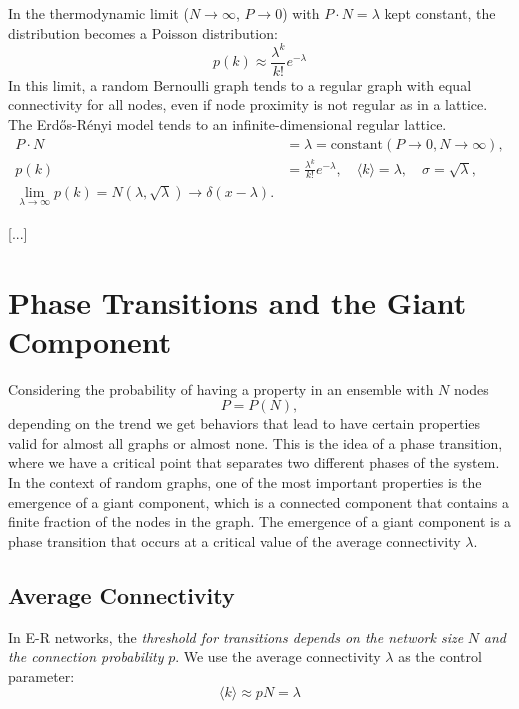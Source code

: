 \begin{remark}
    In the thermodynamic limit ($N \to \infty$, $P \to 0$) with $P \cdot N = \lambda$ kept constant, the distribution becomes a Poisson distribution:
    $$ p(k) \approx \frac{\lambda^k}{k!} e^{-\lambda} $$
    In this limit, a random Bernoulli graph tends to a regular graph with equal connectivity for all nodes, even if node proximity is not regular as in a lattice. The Erdős-Rényi model tends to an infinite-dimensional regular lattice.
    \[
        \begin{aligned}
            P \cdot N & = \lambda = \text{constant} (P \to 0, N \to \infty),                                                   \\
            p(k)      & = \frac{\lambda^k}{k!} e^{-\lambda}, \quad \langle k \rangle = \lambda, \quad \sigma = \sqrt{\lambda}, \\
            \lim_{\lambda \to \infty} p(k) = N(\lambda, \sqrt{\lambda}) \to \delta(x - \lambda).
        \end{aligned}
    \]
\end{remark}

[...]


\section{Phase Transitions and the Giant Component}

Considering the probability of having a property in an ensemble with \(N\) nodes
\[
    P = P (N),
\]
depending on the trend we get behaviors that lead to have certain properties valid for almost all graphs or almost none. This is the idea of a phase transition, where we have a critical point that separates two different phases of the system. In the context of random graphs, one of the most important properties is the emergence of a giant component, which is a connected component that contains a finite fraction of the nodes in the graph. The emergence of a giant component is a phase transition that occurs at a critical value of the average connectivity $\lambda$.

\subsection{Average Connectivity}

In E-R networks, the \textit{threshold for transitions depends on the network size} $N$ \textit{and the connection probability} $p$. We use the average connectivity $\lambda$ as the control parameter:
$$ \langle k \rangle \approx pN = \lambda $$

